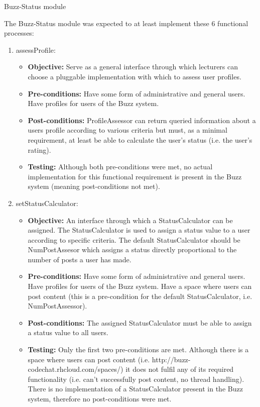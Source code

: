 \item Buzz-Status module
	
The Buzz-Status module was expected to at least implement these 6 functional processes:
	
\begin{enumerate}
	\item assessProfile:
	\begin{itemize}
		\item\textbf{Objective: } Serve as a general interface through which lecturers can choose a pluggable implementation with which to assess user profiles.
		\item\textbf{Pre-conditions: } Have some form of administrative and general users. Have profiles for users of the Buzz system. 
		\item\textbf{Post-conditions: } ProfileAssessor can return queried information about a users profile according to various criteria but must, as a minimal requirement, at least be able to calculate the user’s status (i.e. the user’s rating).
		\item\textbf{Testing: } Although both pre-conditions were met, no actual implementation for this functional requirement is present in the Buzz system (meaning post-conditions not met).
	\end{itemize}
\item setStatusCalculator:
	\begin{itemize}
		\item\textbf{Objective: } An interface through which a StatusCalculator can be assigned. The StatusCalculator is used to assign a status value to a user according to specific criteria. The default StatusCalculator should be NumPostAssesor which assigns a status directly proportional to the number of posts a user has made.
		\item\textbf{Pre-conditions: } Have some form of administrative and general users. Have profiles for users of the Buzz system. Have a space where users can post content (this is a pre-condition for the default StatusCalculator, i.e. NumPostAssessor).
		\item\textbf{Post-conditions: } The assigned StatusCalculator must be able to assign a status value to all users.
		\item\textbf{Testing: } Only the first two pre-conditions are met. Although there is a space where users can post content (i.e. http://buzz-codechat.rhcloud.com/spaces/) it does not fulfil any of its required functionality (i.e. can’t successfully post content, no thread handling). There is no implementation of a StatusCalculator present in the Buzz system, therefore no post-conditions were met.

\end{itemize}
\end{enumerate}
